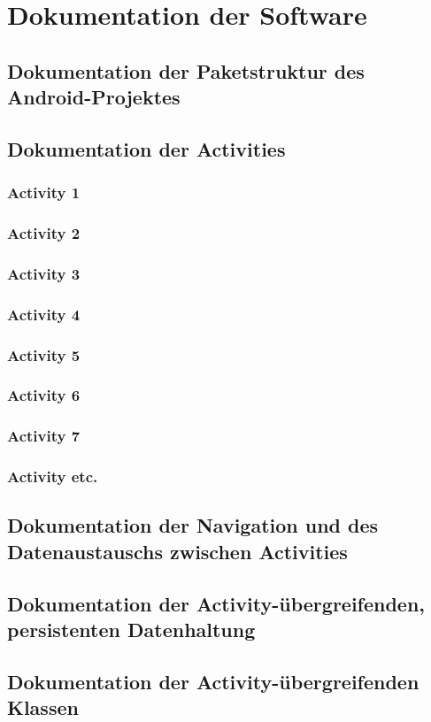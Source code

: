 \section{Dokumentation der Software}
\label{concept}

\subsection{Dokumentation der Paketstruktur des Android-Projektes}

\subsection{Dokumentation der Activities}

\subsubsection{Activity 1}

\subsubsection{Activity 2}

\subsubsection{Activity 3}

\subsubsection{Activity 4}

\subsubsection{Activity 5}

\subsubsection{Activity 6}

\subsubsection{Activity 7}

\subsubsection{Activity etc.}

\subsection{Dokumentation der Navigation und des Datenaustauschs zwischen
Activities}

\subsection{Dokumentation der Activity-übergreifenden, persistenten Datenhaltung}

\subsection{Dokumentation der Activity-übergreifenden Klassen}
